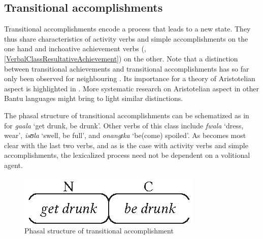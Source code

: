 \subsection{Transitional accomplishments}\label{VerbalClassTransitionalAccomplishment}
Transitional accomplishments encode a process that leads to a new state. They thus share characteristics of activity verbs and simple accomplishments on the one hand and inchoative achievement verbs (, \ref{VerbalClassResultativeAchievement}) on the other. Note that a distinction between transitional achievements and transitional accomplishments has so far only been observed for neighbouring  \citep{BotneR2008}. Its importance for a theory of Aristotelian aspect is highlighted in \citet{PersohnB2017b}. More systematic research on Aristotelian aspect in other Bantu languages might bring to light similar distinctions.

The phasal structure of transitional accomplishments can be schematized as in  for \textit{gaala} \lq get drunk, be drunk'. Other verbs of this class include \textit{fwala} `dress, wear', \textit{isʊla} \lq swell, be full', and \textit{onangɪka} \lq be(come) spoiled'. As becomes most clear with the last two verbs, and as is the case with activity verbs and simple accomplishments, the lexicalized process need not be dependent on a volitional agent.

\begin{figure}[h]
\begin{center}
\includegraphics{figures/GrafikTransitionalAccomplishment.eps}
\end{center}
\caption{Phasal structure of transitional accomplishment}
\label{FigureTransitionalAccomplishment}
\end{figure}

